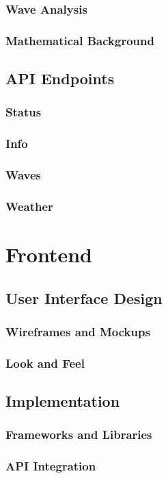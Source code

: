 \documentclass{article}
\begin{document}
    \subsubsection{Wave Analysis}
    \subsubsection{Mathematical Background}
\subsection{API Endpoints}
    \subsubsection{Status}
    \subsubsection{Info}
    \subsubsection{Waves}
    \subsubsection{Weather}

\section{Frontend}
\subsection{User Interface Design}
    \subsubsection{Wireframes and Mockups}
    \subsubsection{Look and Feel}
\subsection{Implementation}
    \subsubsection{Frameworks and Libraries}
    \subsubsection{API Integration}
\end{document}

